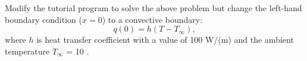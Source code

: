 Modify the tutorial program to solve the above problem but change the left-hand boundary condition ($x=0$) to a convective boundary:
\begin{equation*}
	q(0) = h (T - T_{\infty}),
\end{equation*}
where $h$ is heat transfer coefficient with a value of 100 W/(\C m) and the ambient temperature $T_{\infty}$ = 10 \C .


